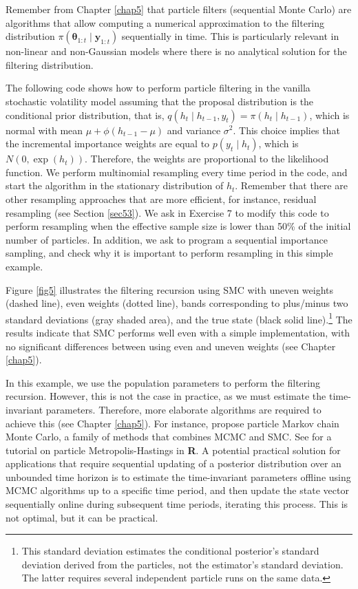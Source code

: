 Remember from Chapter \ref{chap5} that particle filters (sequential Monte Carlo) are algorithms that allow computing a numerical approximation to the filtering distribution $\pi(\bm{\theta}_{1:t}\mid \bm{y}_{1:t})$ sequentially in time. This is particularly relevant in non-linear and non-Gaussian models where there is no analytical solution for the filtering distribution.

The following code shows how to perform particle filtering in the vanilla stochastic volatility model assuming that the proposal distribution is the conditional prior distribution, that is, $q(h_t\mid h_{t-1},y_t)=\pi(h_t\mid h_{t-1})$, which is normal with mean $\mu+\phi(h_{t-1}-\mu)$ and variance $\sigma^2$. This choice implies that the incremental importance weights are equal to $p(y_t\mid h_t)$, which is $N(0,\exp(h_t))$. Therefore, the weights are proportional to the likelihood function. We perform multinomial resampling every time period in the code, and start the algorithm in the stationary distribution of $h_t$. Remember that there are other resampling approaches that are more efficient, for instance, residual resampling (see Section \ref{sec53}). We ask in Exercise 7 to modify this code to perform resampling when the effective sample size is lower than 50\% of the initial number of particles. In addition, we ask to program a sequential importance sampling, and check why it is important to perform resampling in this simple example. 

Figure \ref{fig5} illustrates the filtering recursion using SMC with uneven weights (dashed line), even weights (dotted line), bands corresponding to plus/minus two standard deviations (gray shaded area), and the true state (black solid line).\footnote{This standard deviation estimates the conditional posterior's standard deviation derived from the particles, not the estimator's standard deviation. The latter requires several independent particle runs on the same data.} The results indicate that SMC performs well even with a simple implementation, with no significant differences between using even and uneven weights (see Chapter \ref{chap5}).

In this example, we use the population parameters to perform the filtering recursion. However, this is not the case in practice, as we must estimate the time-invariant parameters. Therefore, more elaborate algorithms are required to achieve this (see Chapter \ref{chap5}). For instance, \cite{andrieu2010pmcmc} propose particle Markov chain Monte Carlo, a family of methods that combines MCMC and SMC. See \cite{dahlin2019getting} for a tutorial on particle Metropolis-Hastings in \textbf{R}. A potential practical solution for applications that require sequential updating of a posterior distribution over an unbounded time horizon is to estimate the time-invariant parameters offline using MCMC algorithms up to a specific time period, and then update the state vector sequentially online during subsequent time periods, iterating this process. This is not optimal, but it can be practical.

